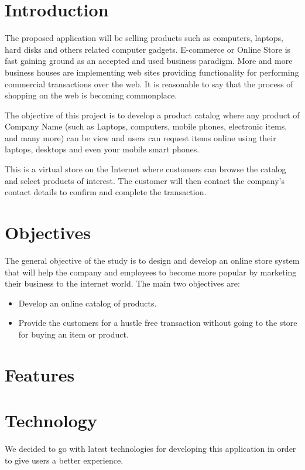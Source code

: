 \documentclass[12pt]{article}
\begin{document}
\section{Introduction}
The proposed application will be selling products such as computers, laptops, hard disks and others related computer gadgets. E-commerce or Online Store is fast gaining ground as an accepted and used business paradigm. More and more business houses are implementing web sites providing functionality for performing commercial transactions over the web. It is reasonable to say that the process of shopping on the web is becoming commonplace. \par
The objective of this project is to develop a product catalog where any product of Company Name (such as Laptops, computers, mobile phones, electronic items, and many more) can be view and users can request items online using their laptops, desktops and even your mobile smart phones. \par
This is a virtual store on the Internet where customers can browse the catalog and select products of interest. The customer will then contact the company’s contact details to confirm and complete the transaction.

\section{Objectives}
The general objective of the study is to design and develop an online store system that will help the company and employees to become more popular by marketing their business to the internet world. The main two objectives are:
\begin{itemize}
    \item Develop an online catalog of products.
    \item Provide the customers for a hustle free transaction without going to the store for buying an item or product.
\end{itemize}

\section{Features}

\section{Technology}
We decided to go with latest technologies for developing this application in order to give users a better experience.
\end{document}
